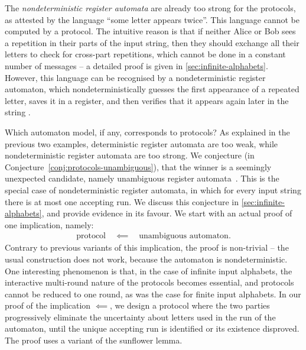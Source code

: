 
\begin{myexample}
    \label{ex:reg-ndet-too-strong}
    The \emph{nondeterministic register automata} \cite[Definition~1]{kaminskiFiniteMemoryAutomata1994} are already too strong for the protocols, as attested by the language
    ``some letter appears twice''. This language cannot be computed by a protocol. The intuitive reason is that if neither Alice or Bob sees a repetition in their parts of the input string, then they should exchange all their letters to check for cross-part repetitions, which cannot be done in a constant number of messages -- 
    a detailed proof is given in \cref{sec:infinite-alphabets}. However, this language can be recognised by a nondeterministic register automaton, 
    which nondeterministically guesses the first appearance of a repeated letter, saves it in a register, and then verifies that it appears again later in the string
    \cite[Example~1]{kaminskiFiniteMemoryAutomata1994}.
\end{myexample}

Which automaton model, if any, corresponds to protocols? As explained in the previous two examples, deterministic register automata are too weak, while nondeterministic register automata are too strong.
We conjecture (in Conjecture~\ref{conj:protocols-unambiguous}), that the winner is a seemingly  unexpected candidate, namely unambiguous register automata~\cite[Section 5]{colcombet2015unambiguity}. This is the special case of  nondeterministic register automata, in which for every input string there is at most one accepting run.
We discuss this conjecture in \cref{sec:infinite-alphabets}, and provide evidence in its favour. We start with an actual proof of one implication, namely:
\begin{align*}
\text{protocol} \quad \impliedby \quad \text{unambiguous automaton}.
\end{align*}
Contrary to  previous variants of this implication, the proof is non-trivial -- the usual construction does not work, because the automaton is nondeterministic. One  interesting phenomenon is that, in the case of infinite input alphabets, the interactive multi-round nature of the protocols becomes essential, and protocols cannot be reduced to one round, as was the case for finite input alphabets. In our proof of the implication $\impliedby$, we design a protocol where  the two parties  progressively eliminate the uncertainty about letters used in the run of the automaton, until the unique accepting run is identified or its existence disproved.
The proof uses a variant of the sunflower lemma.

